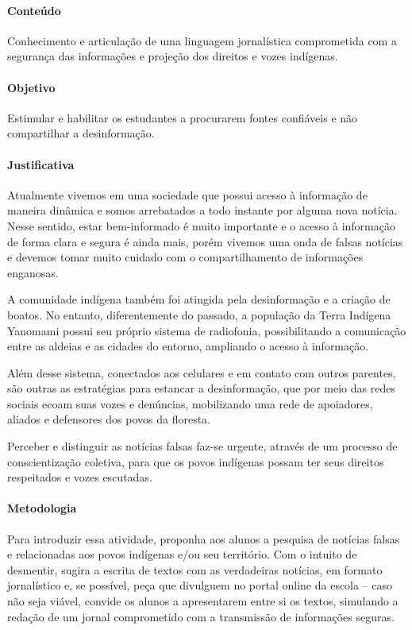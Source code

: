 \documentclass[12pt]{extarticle}
\begin{document}
\paragraph{Conteúdo} Conhecimento e articulação de uma linguagem jornalística
comprometida com a segurança das informações e projeção dos direitos e vozes
indígenas. 

\paragraph{Objetivo} Estimular e habilitar os estudantes a procurarem fontes
confiáveis e não compartilhar a desinformação.

\paragraph{Justificativa} Atualmente vivemos em uma sociedade que possui acesso 
à informação de maneira dinâmica e somos arrebatados a todo instante por alguma 
nova notícia. Nesse sentido, estar bem-informado é muito importante e o acesso à
informação de forma clara e segura é ainda mais, porém vivemos uma onda de falsas 
notícias e devemos tomar muito cuidado com o compartilhamento de informações enganosas.

A comunidade indígena também foi atingida pela desinformação e a criação de boatos.
No entanto, diferentemente do passado, a população da Terra Indígena Yanomami possui seu
próprio sistema de radiofonia, possibilitando a comunicação entre as aldeias e as cidades 
do entorno, ampliando o acesso à informação.

Além desse sistema, conectados aos celulares e em contato com outros parentes, são outras as
estratégias para estancar a desinformação, que por meio das redes sociais ecoam suas vozes e 
denúncias, mobilizando uma rede de apoiadores, aliados e defensores dos povos da floresta. 

Perceber e distinguir as notícias falsas faz-se urgente, através de um processo de conscientização
coletiva, para que os povos indígenas possam ter seus direitos respeitados e vozes escutadas. 

\paragraph{Metodologia} 

Para introduzir essa atividade, proponha aos alunos a pesquisa de notícias falsas e relacionadas
aos povos indígenas e/ou seu território. Com o intuito de desmentir, sugira a escrita de textos
com as verdadeiras notícias, em formato jornalístico e, se possível, peça que divulguem no
portal online da escola – caso não seja viável, convide os alunos a apresentarem entre si os textos, 
simulando a redação de um jornal comprometido com a transmissão de informações seguras.  
\end{document}
